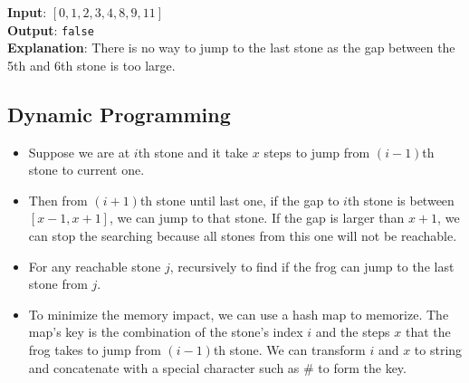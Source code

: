 \begin{flushleft}
\textbf{Input}: $[0,1,2,3,4,8,9,11]$
\\
\textbf{Output}: \texttt{false}
\\
\textbf{Explanation}: There is no way to jump to the last stone as the gap between the 5th and 6th stone is too large.
\end{flushleft}

\subsection{Dynamic Programming}
\begin{itemize}
\item Suppose we are at $i$th stone and it take $x$ steps to jump from $(i-1)$th stone to current one.
\item Then from $(i+1)$th stone until last one, if the gap to $i$th stone is between $[x-1,x+1]$, we can jump to that stone. If the gap is larger than $x+1$, we can stop the searching because all stones from this one will not be reachable.
\item For any reachable stone $j$, recursively to find if the frog can jump to the last stone from $j$.
\item To minimize the memory impact, we can use a hash map to memorize. The map's key is the combination of the stone's index $i$ and the steps $x$ that the frog takes to jump from $(i-1)$th stone. We can transform $i$ and $x$ to string and concatenate with a special character such as \# to form the key.
\end{itemize}

